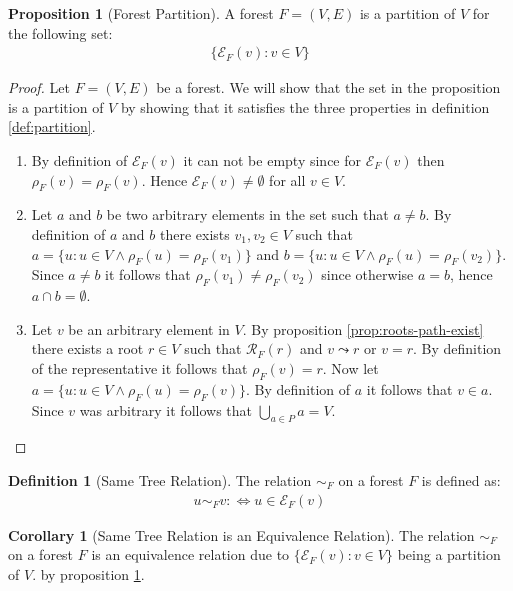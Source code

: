 \documentclass[a4paper,12pt]{article}
\theoremstyle{definition}
\newtheorem{definition}{Definition}[section]
\newtheorem{proposition}{Proposition}[section]
\newtheorem{corollary}{Corollary}[section]
\begin{document}
\begin{proposition}[Forest Partition]\label{prop:forest-partition}
    A forest $F = (V, E)$ is a partition of $V$ for the following set:
    \begin{align*}
        \{\mathcal{E}_F(v) : v \in V\}
    \end{align*}
\end{proposition}

\begin{proof}
    Let $F = (V, E)$ be a forest. We will show that the set in the proposition
    is a partition of $V$ by showing that it satisfies the three properties in
    definition \ref{def:partition}.
    \begin{enumerate}
        \item By definition of $\mathcal{E}_F(v)$ it can not be empty since for
        $\mathcal{E}_F(v)$ then $\rho_F(v) = \rho_F(v)$. Hence $\mathcal{E}_F(v)
        \neq \emptyset$ for all $v \in V$.
        \item Let $a$ and $b$ be two arbitrary elements in the set such that $a
        \neq b$. By definition of $a$ and $b$ there exists $v_1, v_2 \in V$ such
        that $a = \{u : u \in V \land \rho_F(u) = \rho_F(v_1)\}$ and $b = \{u :
        u \in V \land \rho_F(u) = \rho_F(v_2)\}$. Since $a \neq b$ it follows
        that $\rho_F(v_1) \neq \rho_F(v_2)$ since otherwise $a = b$, hence $a
        \cap b = \emptyset$.
        \item Let $v$ be an arbitrary element in $V$. By proposition
        \ref{prop:roots-path-exist} there exists a root $r \in V$ such that
        $\mathcal{R}_F(r)$ and $v \leadsto r$ or $v = r$. By definition of the
        representative it follows that $\rho_F(v) = r$. Now let $a = \{u : u \in
        V \land \rho_F(u) = \rho_F(v)\}$. By definition of $a$ it follows that
        $v \in a$. Since $v$ was arbitrary it follows that $\bigcup_{a \in P} a
        = V$.
    \end{enumerate}
\end{proof}

\begin{definition}[Same Tree Relation]
    The relation $\sim_F$ on a forest $F$ is defined as:
    \begin{align*}
        u \sim_F v :\iff u \in \mathcal{E}_F(v)
    \end{align*}
\end{definition}

\begin{corollary}[Same Tree Relation is an Equivalence Relation]
    The relation $\sim_F$ on a forest $F$ is an equivalence relation due to
    $\{\mathcal{E}_F(v) : v \in V\}$ being a partition of $V$. by proposition
    \ref{prop:forest-partition}.
\end{corollary}
\end{document}
